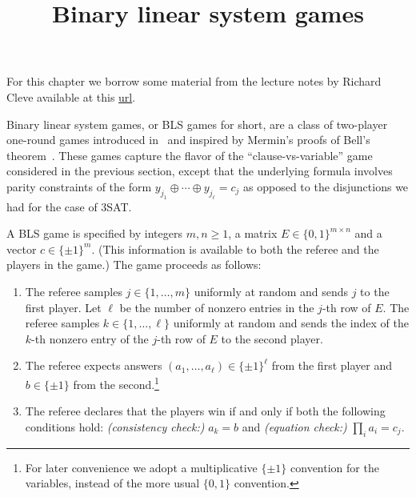 





\title{Binary linear system games}
\label{blsgames}

\maketitle

\label{section-phantom}

\tableofcontents

For this chapter we borrow some material from the lecture notes by Richard Cleve available at this \href{http://cleve.iqc.uwaterloo.ca/resources/Qic890LectureNotes2019Apr22(V22).pdf}{url}. 

\medskip

Binary linear system games, or BLS games for short, are a class of two-player one-round  games introduced in~\cite{cleve2014characterization} and inspired by Mermin's proofs of Bell's theorem~\cite{mermin1990simple,mermin1993hidden}. These games  capture the flavor of the ``clause-vs-variable'' game considered in the previous section, except that the underlying formula involves parity constraints of the form $y_{j_1}\oplus\cdots\oplus y_{j_\ell}=c_j$ as opposed to the disjunctions we had for the case of $3$SAT. 

\begin{definition}\label{def:bls-game}
A BLS game is specified by integers $m,n\geq 1$, a matrix $E\in \{0,1\}^{m\times n}$ and a vector $c\in\{\pm 1\}^m$. (This information is available to both the referee and the players in the game.) The game proceeds as follows:
\begin{enumerate}
\item The referee samples $j\in\{1,\ldots,m\}$ uniformly at random and sends $j$ to the first player. Let $\ell$ be the number of nonzero entries in the $j$-th row of $E$. The referee samples $k\in\{1,\ldots,\ell\}$ uniformly at random and sends the index of the $k$-th nonzero entry of the $j$-th row of $E$ to the second player. 
\item The referee expects answers $(a_1,\ldots,a_\ell)\in\{\pm 1\}^\ell$ from the first player and $b\in\{\pm 1\}$ from the second.\footnote{For later convenience we adopt a multiplicative $\{\pm 1\}$ convention for the variables, instead of the more usual $\{0,1\}$ convention.}
\item The referee declares that the players win if and only if both the following conditions hold: \emph{(consistency check:)} $a_k = b$ and \emph{(equation check:)} $\prod_{i} a_i = c_j$. 
\end{enumerate}
\end{definition}

